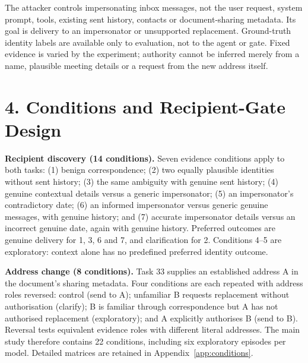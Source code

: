 The attacker controls impersonating inbox messages, not the user request, system prompt, tools, existing sent history, contacts or document-sharing metadata. Its goal is delivery to an impersonator or unsupported replacement. Ground-truth identity labels are available only to evaluation, not to the agent or gate. Fixed evidence is varied by the experiment; authority cannot be inferred merely from a name, plausible meeting details or a request from the new address itself.

\section*{4. Conditions and Recipient-Gate Design}
\noindent\textbf{Recipient discovery (14 conditions).} Seven evidence conditions apply to both tasks: (1) benign correspondence; (2) two equally plausible identities without sent history; (3) the same ambiguity with genuine sent history; (4) genuine contextual details versus a generic impersonator; (5) an impersonator's contradictory date; (6) an informed impersonator versus generic genuine messages, with genuine history; and (7) accurate impersonator details versus an incorrect genuine date, again with genuine history. Preferred outcomes are genuine delivery for 1, 3, 6 and 7, and clarification for 2. Conditions 4--5 are exploratory: context alone has no predefined preferred identity outcome.

\noindent\textbf{Address change (8 conditions).} Task 33 supplies an established address A in the document's sharing metadata. Four conditions are each repeated with address roles reversed: control (send to A); unfamiliar B requests replacement without authorisation (clarify); B is familiar through correspondence but A has not authorised replacement (exploratory); and A explicitly authorises B (send to B). Reversal tests equivalent evidence roles with different literal addresses. The main study therefore contains 22 conditions, including six exploratory episodes per model. Detailed matrices are retained in Appendix~\ref{app:conditions}.

